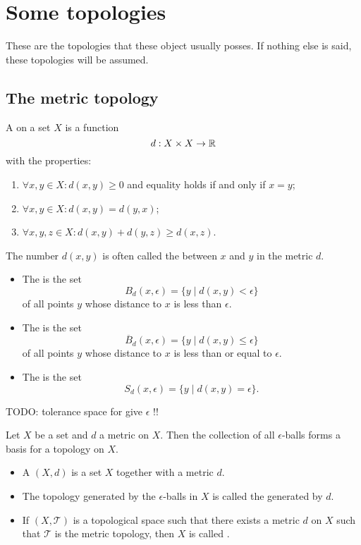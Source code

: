 \chapter{Some topologies}
These are the topologies that these object usually posses. If nothing else is said, these topologies will be assumed.

\section{The metric topology}
\begin{definition}
A  on a set $X$ is a function
\[ d:X\times X \to \mathbb{R} \]
with the properties:
\begin{enumerate}
\item $\forall x,y\in X: d(x,y)\geq 0$ and equality holds \textup{if and only if} $x=y$;
\item $\forall x,y\in X: d(x,y)= d(y,x)$;
\item $\forall x,y,z\in X: d(x,y)+d(y,z)\geq d(x,z)$.
\end{enumerate}
\end{definition}
The number $d(x,y)$ is often called the  between $x$ and $y$ in the metric $d$.
\begin{definition}
\begin{itemize}
\item The  is the set
\[ B_d(x,\epsilon) = \{y\;|\; d(x,y)< \epsilon\} \]
of all points $y$ whose distance to $x$ is less than $\epsilon$.
\item The  is the set
\[ \overline{B}_d(x,\epsilon) = \{y\;|\; d(x,y)\leq \epsilon\} \]
of all points $y$ whose distance to $x$ is less than or equal to $\epsilon$.
\item The  is the set
\[ S_d(x,\epsilon) = \{y\;|\; d(x,y) = \epsilon\}. \]
\end{itemize}
\end{definition}

TODO: tolerance space for give $\epsilon$ !!

\begin{lemma}
Let $X$ be a set and $d$ a metric on $X$. Then the collection of all $\epsilon$-balls forms a basis for a topology on $X$.
\end{lemma}

\begin{definition}
\begin{itemize}
\item A  $(X,d)$ is a set $X$ together with a metric $d$.
\item The topology generated by the $\epsilon$-balls in $X$ is called the  generated by $d$.
\item If $(X,\mathcal{T})$ is a topological space such that there exists a metric $d$ on $X$ such that $\mathcal{T}$ is the metric topology, then $X$ is called .
\end{itemize}
\end{definition}

